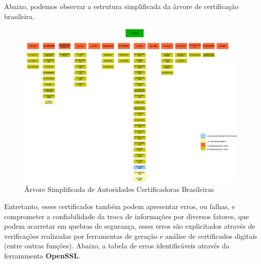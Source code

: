 	Abaixo, podemos observar a estrutura simplificada da árvore de certificação brasileira.

	\begin{figure}[h]
		\centering
		\label{img08}
		\caption{Árvore Simplificada de Autoridades Certificadoras Brasileiras \cite{itiICPBRASIL}}
		\includegraphics[keepaspectratio=true,scale=0.7]{figuras/certBR.eps}
	\end{figure}

	Entretanto, esses certificados também podem apresentar erros, ou falhas, e comprometer a confiabilidade da troca de informações por diversos fatores, que podem acarretar em quebras de segurança, esses erros são explicitados através de verificações realizadas por ferramentas de geração e análise de certificados digitais (entre outras funções). Abaixo, a tabela de erros identificáveis através da ferrammenta \textbf{OpenSSL}. 

